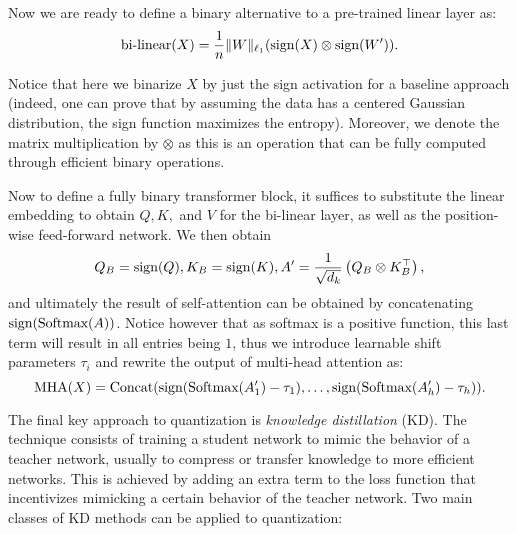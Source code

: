 Now we are ready to define a binary alternative to a pre-trained linear layer as:
\begin{equation}
    \text{bi-linear}(X) = \frac{1}{n}\|W\|_{\ell_1} (\text{sign}(X) \otimes \text{sign}(W')).
\end{equation}

Notice that here we binarize $X$ by just the sign activation for a baseline approach (indeed, one can prove that by assuming the data has a centered Gaussian distribution, the sign function maximizes the entropy). Moreover, we denote the matrix multiplication by $\otimes$ as this is an operation that can be fully computed through efficient binary operations.

\vspace{1em}

Now to define a fully binary transformer block, it suffices to substitute the linear embedding to obtain $Q, K,$ and $V$ for the bi-linear layer, as well as the position-wise feed-forward network. We then obtain 
\begin{equation}
   Q_B = \text{sign}(Q), K_B = \text{sign}(K), A' = \frac{1}{\sqrt{d_k}}\left( Q_B \otimes K_B^\top \right), 
\end{equation}
and ultimately the result of self-attention can be obtained by concatenating $\text{sign}(\text{Softmax}(A))$. Notice however that as softmax is a positive function, this last term will result in all entries being $1$, thus we introduce learnable shift parameters $\tau_i$ and rewrite the output of multi-head attention as:
\begin{equation}
    \text{MHA}(X) = \text{Concat}(\text{sign}(\text{Softmax}(A'_1) - \tau_1), \ldots, \text{sign}(\text{Softmax}(A'_h) - \tau_h)).
\end{equation}


\vspace{1em}

The final key approach to quantization is \textit{knowledge distillation} (KD)\cite{hinton2015distilling}. The technique consists of training a student network to mimic the behavior of a teacher network, usually to compress or transfer knowledge to more efficient networks. This is achieved by adding an extra term to the loss function that incentivizes mimicking a certain behavior of the teacher network. Two main classes of KD methods can be applied to quantization:

